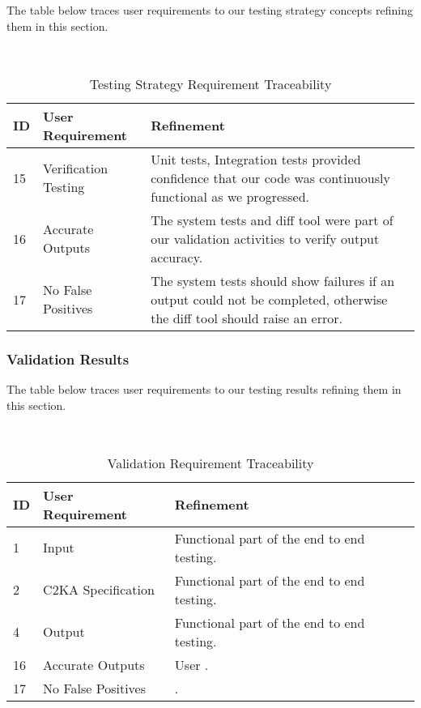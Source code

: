 
    The table below traces user requirements to our testing strategy concepts refining them in this section.
    \begin{table}[htbp]
        \centering
        \caption{Testing Strategy Requirement Traceability}\label{tab:test-strat-table}\\
        \begin{tabularx}{\textwidth}{| l | l | X |}
            \hline
            \textbf{ID} & \textbf{User Requirement} & \textbf{Refinement} \\
            \hline
            15 & Verification Testing & Unit tests, Integration tests provided confidence that our code was continuously functional as we progressed. \\ \hline
            16 & Accurate Outputs & The system tests and diff tool were part of our validation activities to verify output accuracy. \\ \hline
            17 & No False Positives & The system tests should show failures if an output could not be completed, otherwise the diff tool should raise an error. \\ \hline
        \end{tabularx}
    \end{table}
    \newpage
    \subsubsection{Validation Results}\label{subsubsec:test-validation}

    The table below traces user requirements to our testing results refining them in this section.
    \begin{table}[htbp]
        \centering
        \caption{Validation Requirement Traceability}\label{tab:test-res-table}\\
        \begin{tabularx}{\textwidth}{| l | l | X |}
            \hline
            \textbf{ID} & \textbf{User Requirement} & \textbf{Refinement} \\
            \hline
            1 & Input & Functional part of the end to end testing. \\ \hline
            2 & C2KA Specification & Functional part of the end to end testing.\\ \hline
            4 & Output & Functional part of the end to end testing.\\ \hline
            16 & Accurate Outputs & User . \\ \hline %
            17 & No False Positives & . \\ \hline %
        \end{tabularx}
    \end{table}

